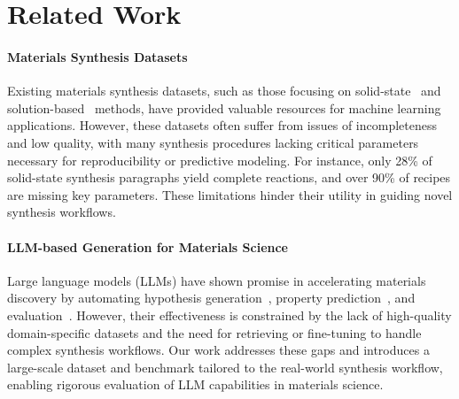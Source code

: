 \section{Related Work}
\paragraph*{Materials Synthesis Datasets}

Existing materials synthesis datasets, such as those focusing on solid-state~\cite{kononova2019text} and solution-based~\cite{wang2022dataset} methods, have provided valuable resources for machine learning applications. However, these datasets often suffer from issues of incompleteness and low quality, with many synthesis procedures lacking critical parameters necessary for reproducibility or predictive modeling. For instance, only 28\% of solid-state synthesis paragraphs yield complete reactions, and over 90\% of recipes are missing key parameters. These limitations hinder their utility in guiding novel synthesis workflows.

\paragraph*{LLM-based Generation for Materials Science}

Large language models (LLMs) have shown promise in accelerating materials discovery by automating hypothesis generation~\cite{kumbhar2025hypothesisgenerationmaterialsdiscovery}, property prediction~\cite{chiang2024llamplargelanguagemodel}, and evaluation~\cite{mishra2024llamat}. However, their effectiveness is constrained by the lack of high-quality domain-specific datasets and the need for retrieving or fine-tuning to handle complex synthesis workflows. Our work addresses these gaps and introduces a large-scale dataset and benchmark tailored to the real-world synthesis workflow, enabling rigorous evaluation of LLM capabilities in materials science.


%